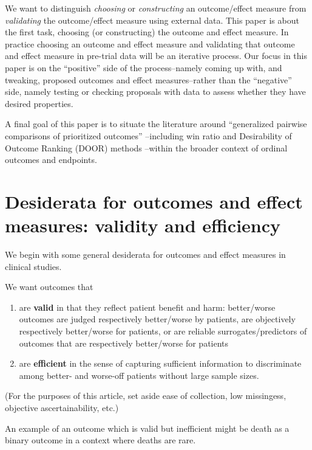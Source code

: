 \documentclass[
  11pt,
  fleqn
]{article}
\begin{document}
We want to distinguish \emph{choosing} or \emph{constructing} an outcome/effect
measure from \emph{validating} the outcome/effect measure using external data.
This paper is about the first task, choosing (or constructing) the outcome and
effect measure. In practice choosing an outcome and effect measure and
validating that outcome and effect measure in pre-trial data will be an
iterative process. Our focus in this paper is on the ``positive'' side of the
process--namely coming up with, and tweaking, proposed outcomes and effect
measures--rather than the ``negative'' side, namely testing or checking
proposals with data to assess whether they have desired properties.

A final goal of this paper is to situate the literature around ``generalized
pairwise comparisons of prioritized outcomes''
\citep{buyseGeneralizedPairwiseComparisons2022}--including win ratio
\citep{pocockWinRatioNew2012} and Desirability of Outcome Ranking (DOOR)
methods \citep{evansDesirabilityOutcomeRanking2015,
ongUnlockingDOORHow2023}--within the broader context of ordinal outcomes and
endpoints.

\section{Desiderata for outcomes and effect measures: validity and efficiency}

We begin with some general desiderata for outcomes and effect measures in
clinical studies.

We want outcomes that
\begin{enumerate}
  \item are \textbf{valid} in that they reflect patient benefit and harm:
    better/worse outcomes are judged respectively better/worse by patients, are
    objectively respectively better/worse for patients, or are reliable
    surrogates/predictors of outcomes that are respectively better/worse for
    patients
  \item are \textbf{efficient} in the sense of capturing
    sufficient information to
    discriminate among better- and worse-off patients without large
    sample sizes.
\end{enumerate}
(For the purposes of this article, set aside ease of collection, low
missingess, objective ascertainability, etc.)

An example of an outcome which is valid but inefficient might be
death as a binary outcome in a context where deaths
are rare.
\end{document}
